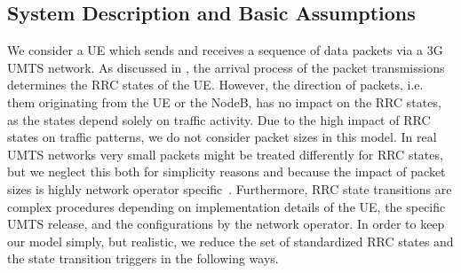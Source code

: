 \subsection{System Description and Basic Assumptions}\label{sec:network:performance_model:system_description}

\newcommand{\PacketIAT}{A}

We consider a \gls{UE} which sends and receives a sequence of data packets via a \gls{3G} \gls{UMTS} network.
As discussed in , the arrival process of the packet transmissions determines the \gls{RRC} states of the \gls{UE}.
However, the direction of packets, i.e. them originating from the \gls{UE} or the \gls{NodeB}, has no impact on the \gls{RRC} states, as the states depend solely on traffic activity.
Due to the high impact of \gls{RRC} states on traffic patterns, we do not consider packet sizes in this model.
In real \gls{UMTS} networks very small packets might be treated differently for \gls{RRC} states, but we neglect this both for simplicity reasons and because the impact of packet sizes is highly network operator specific~\cite{Qian2010a}.
Furthermore, \gls{RRC} state transitions are complex procedures depending on implementation details of the \gls{UE}, the specific \gls{UMTS} release, and the configurations by the network operator.
In order to keep our model simply, but realistic, we reduce the set of standardized \gls{RRC} states and the state transition triggers in the following ways. 

